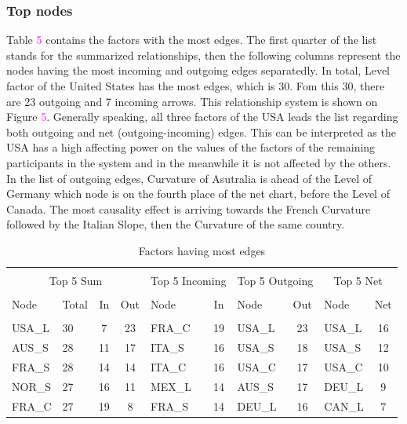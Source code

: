 \documentclass[12pt,bibliography=totoc]{article}
\begin{document}
\subsubsection{Top nodes}

Table \textcolor{magenta}{5} contains the factors with the most edges. The first quarter of the list stands for the summarized relationships, then the following columns represent the nodes having the most incoming and outgoing edges separatedly. In total, Level factor of the United States has the most edges, which is 30. Fom this 30, there are 23 outgoing and 7 incoming arrows. This relationship system is shown on Figure \textcolor{magenta}{5}. Generally speaking, all three factors of the USA leads the list regarding both outgoing and net (outgoing-incoming) edges. This can be interpreted as the USA has a high affecting power on the values of the factors of the remaining participants in the system and in the meanwhile it is not affected by the others. In the list of outgoing edges, Curvature of Asutralia is ahead of the Level of Germany which node is on the fourth place of the net chart, before the Level of Canada. The most causality effect is arriving towards the French Curvature followed by the Italian Slope, then the Curvature of the same country.

\begin{table}[h]

\fontsize{10}{10}\selectfont
\setlength{\tabcolsep}{10pt}
\centering%
\begin{tabular}{l  lcc  lc lc  lc}%

\hline\hline \\ [-1.5ex]                         %


\multicolumn{4}{c}{Top 5 Sum}					&	\multicolumn{2}{c}{Top 5 Incoming}			&	\multicolumn{2}{c}{Top 5 Outgoing}			&	\multicolumn{2}{c}{Top 5 Net}	\\	
\hline \\ [-1.5ex]    
Node	&	Total 	&	In	&	Out	&	Node	&	In	&	Node	&	Out	&	Node	&	Net	\\
\hline \\ [-1.5ex]    
USA\_L&	30	&	7	&	23	&	FRA\_C	&	19	&	USA\_L	&	23	&	USA\_L	&	16	\\
AUS\_S	&	28	&	11	&	17	&	ITA\_S	&	16	&	USA\_S	&	18	&	USA\_S	&	12	\\
FRA\_S	&	28	&	14	&	14	&	ITA\_C	&	16	&	USA\_C	&	17	&	USA\_C	&	10	\\
NOR\_S	&	27	&	16	&	11	&	MEX\_L	&	14	&	AUS\_S	&	17	&	DEU\_L	&	9	\\
FRA\_C	&	27	&	19	&	8	&	FRA\_S	&	14	&	DEU\_L	&	16	&	CAN\_L	&	7	\\

\hline            
\end{tabular}
\label{table:nonlin}%

\caption{Factors having most edges} %

\end{table}
\end{document}
